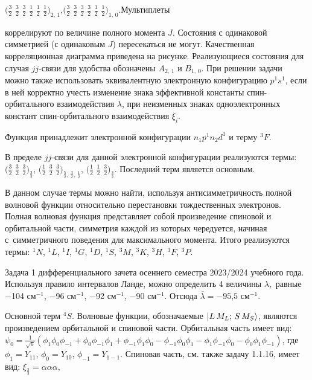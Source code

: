 $\Big( \frac32\,\,\frac32\,\,\frac32\,\,\frac12\,\,\frac12\,\,\frac12 \Big)_{2,\,1}$,\hspace{\fill}$\Big( \frac32\,\,\frac32\,\,\frac32\,\,\frac32\,\,\frac12\,\,\frac12 \Big)_{1,\,0}$.\hspace{\fill}Мультиплеты\par
\vspace{-\parskip+1mm}
коррелируют по величине полного момента $J$. Состояния с одинаковой симметрией (с одинаковым $J$) пересекаться не могут. Качественная корреляционная диаграмма приведена на рисунке. Реализующиеся состояния для случая $jj$-связи для удобства обозначены $A_{2,\,1}$ и $B_{1,\,0}$. При решении задачи можно также использовать эквивалентную электронную конфигурацию $p^1s^1$, если в ней корректно учесть изменение знака эффективной константы спин-орбитального взаимодействия $\lambda$, при неизменных знаках одноэлектронных констант спин-орбитального взаимодействия $\xi_i$. \par
{} Функция принадлежит электронной конфигурации $n_1p^1n_2d^1$ и терму $^3F$.\par
{} В пределе $jj$-связи для данной электронной конфигурации реализуются термы: $\Big( \frac32\,\,\frac32\,\,\frac32 \Big)_{\frac32}$, $\Big( \frac12\,\,\frac32\,\,\frac32 \Big)_{\frac52,\,\frac32,\,\frac12}$, $\Big( \frac12\,\,\frac12\,\,\frac32 \Big)_{\frac32}$. Последний терм является основным.\par
{} В данном случае термы можно найти, используя антисимметричность полной волновой функции относительно перестановки тождественных электронов. Полная волновая функция представляет собой произведение спиновой и орбитальной части, симметрия каждой из которых чередуется, начиная с~симметричного поведения для максимального момента. Итого реализуются термы: $^1N$, $^1L$, $^1I$, $^1G$, $^1D$, $^1S$, $^3M$, $^3K$, $^3H$, $^3F$, $^3P$.\par
{} Задача 1 дифференциального зачета осеннего семестра 2023/2024 учебного года. Используя правило интервалов Ланде, можно определить 4 величины $\lambda$,~равные $-$104 см$^{-1}$, $-$96 см$^{-1}$, $-$92 см$^{-1}$, $-$90 см$^{-1}$. Отсюда $\overline \lambda = -\text{95,5}$ см$^{-1}$.\par
{} Основной терм $^4S$. Волновые функции, обозначаемые $\ket{L\,M_L;\,S\,M_S}$, являются произведением орбитальной и спиновой части. Орбитальная часть имеет вид: $\psi_0=\frac{1}{\sqrt6}(\phi_1\phi_0\phi_{-1} + \phi_0\phi_{-1}\phi_{1} + \phi_{-1}\phi_1\phi_{0} - \phi_{-1}\phi_0\phi_{1} - \phi_1\phi_{-1}\phi_{0} - \phi_0\phi_1\phi_{-1} )$, где $\phi_1 = \textit{Y}_{11}$, $\phi_0 = \textit{Y}_{10}$, $\phi_{-1} = \textit{Y}_{1-1}$. Спиновая часть, см. также задачу 1.1.16, имеет вид: $\xi_{\frac32}=\alpha \alpha \alpha$, \par
